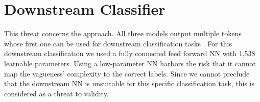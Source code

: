 \section{Downstream Classifier}
\label{chp:threats_to_validity:sec:downstream_classifier}

This threat concerns the approach.
All three models output multiple tokens whose first one can be used for downstream classification tasks \parencite{Devlin:2018}.
For this downstream classification we used a fully connected feed forward \ac{NN} with 1,538 learnable parameters.
Using a low-parameter \ac{NN} harbors the risk that it cannot map the vagueness' complexity to the correct labels.
Since we cannot preclude that the downstream \ac{NN} is unsuitable for this specific classification task, this is considered as a threat to validity.
